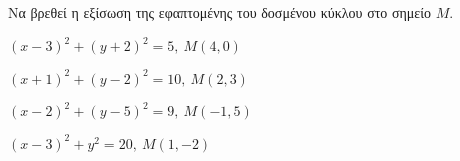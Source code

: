 Να βρεθεί η εξίσωση της εφαπτομένης του δοσμένου κύκλου στο σημείο $ M $.
\begin{alist}
\item $ (x-3)^2+(y+2)^2=5,\ M(4,0) $
\item $ (x+1)^2+(y-2)^2=10,\ M(2,3) $
\item $ (x-2)^2+(y-5)^2=9,\ M(-1,5) $
\item $ (x-3)^2+y^2=20,\ M(1,-2) $
\end{alist}
